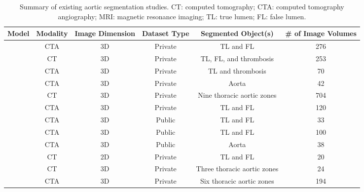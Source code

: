 \begin{table*}[!hbt]
\caption{Summary of existing aortic segmentation studies. CT: computed tomography; CTA: computed tomography angiography; MRI: magnetic resonance imaging; TL: true lumen; FL: false lumen.}
\centering
\renewcommand{\arraystretch}{1.2} %
\footnotesize
\begin{tabular}{|c|c|c|c|c|c|}
\hline
\textbf{Model} & \textbf{Modality} & \textbf{Image Dimension} & \textbf{Dataset Type} & \textbf{Segmented Object(s)} & \textbf{\# of Image Volumes} \\ \hline
\cite{cao2019fully}          & CTA            & 3D          & Private        & TL and FL                     & 276 \\ \hline
\cite{jung2024zozi}          & CT             & 3D          & Private        & TL, FL, and thrombosis         & 253 \\ \hline
\cite{mu2023automatic}       & CTA            & 3D          & Private        & TL and thrombosis              & 70  \\ \hline
\cite{lyu2021dissected}      & CTA            & 3D          & Private        & Aorta                          & 42  \\ \hline
\cite{koo2024deep}           & CT             & 3D          & Private        & Nine thoracic aortic zones     & 704 \\ \hline
\cite{chen2021multi}         & CTA            & 3D          & Private        & TL and FL                      & 120 \\ \hline
\cite{xu2023sliceprop}       & CTA            & 3D          & Public         & TL and FL                      & 33  \\ \hline
\cite{li2023evaluating}      & CTA            & 3D          & Public         & TL and FL                      & 100 \\ \hline
\cite{10.1007/978-3-031-53241-2_7} & CTA      & 3D          & Public         & Aorta                          & 38  \\ \hline
\cite{cheng2020deep}         & CT             & 2D          & Private        & TL and FL                      & 20  \\ \hline
\cite{noothout2018automatic} & CT             & 3D          & Private        & Three thoracic aortic zones    & 24  \\ \hline
\cite{zhong2021segmentation} & CTA            & 3D          & Private        & Six thoracic aortic zones      & 194 \\ \hline

\end{tabular}
\end{table*}
